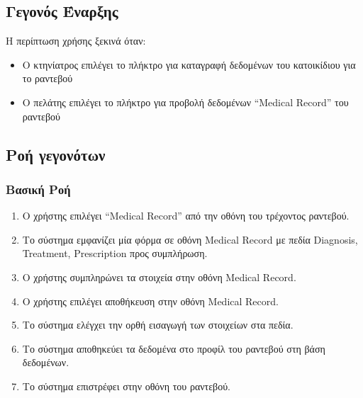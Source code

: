 \documentclass[12pt,a4paper,twoside]{book}
\begin{document}
\subsection{Γεγονός Έναρξης}
Η περίπτωση χρήσης ξεκινά όταν:
\begin{itemize}
  \item Ο κτηνίατρος επιλέγει το πλήκτρο για καταγραφή δεδομένων του κατοικίδιου για το ραντεβού  %
  \item Ο πελάτης επιλέγει το πλήκτρο για προβολή δεδομένων “Medical Record” του ραντεβού %
\end{itemize}

\subsection{Ροή γεγονότων}

\subsubsection{Βασική Ροή}
\begin{enumerate}
  \item Ο χρήστης επιλέγει “Medical Record” από την οθόνη του τρέχοντος ραντεβού.  %
  \item Το σύστημα εμφανίζει μία φόρμα σε οθόνη Medical Record με πεδία Diagnosis, Treatment, Prescription προς συμπλήρωση. %
  \item Ο χρήστης συμπληρώνει τα στοιχεία στην οθόνη Medical Record. %
  \item Ο χρήστης επιλέγει αποθήκευση στην οθόνη Medical Record. %
  \item Το σύστημα ελέγχει την ορθή εισαγωγή των στοιχείων στα πεδία. %
  \item Το σύστημα αποθηκεύει τα δεδομένα στο προφίλ του ραντεβού στη βάση δεδομένων. %
  \item Το σύστημα επιστρέφει στην οθόνη του ραντεβού. %
\end{enumerate}
\end{document}
